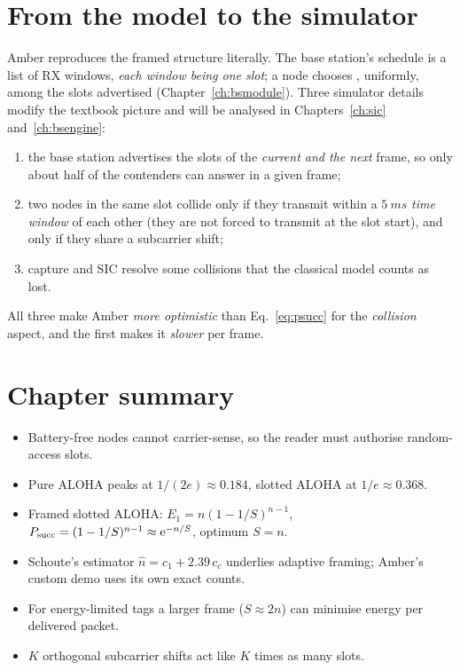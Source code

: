 \section{From the model to the simulator}

Amber reproduces the framed structure literally. The base station's schedule is a list of
RX windows, \emph{each window being one slot}; a node chooses , uniformly, among the slots advertised
(Chapter~\ref{ch:bsmodule}). Three simulator details modify the textbook picture and will be analysed in Chapters~\ref{ch:sic} and~\ref{ch:bsengine}:
\begin{enumerate}
 \item the base station advertises the slots of the \emph{current and the next} frame, so only about half of the contenders
   can answer in a given frame;
 \item two nodes in the same slot collide only if they transmit within a $\SI{5}{ms}$ \emph{time window} of each other
   (they are not forced to transmit at the slot start), and only if they share a subcarrier shift;
 \item capture and SIC resolve some collisions that the classical model counts as lost.
\end{enumerate}
All three make Amber \emph{more optimistic} than Eq.~\eqref{eq:psucc} for the \emph{collision} aspect, and the first makes it \emph{slower} per frame.

\section{Chapter summary}
\begin{itemize}
 \item Battery-free nodes cannot carrier-sense, so the reader must authorise random-access slots.
 \item Pure ALOHA peaks at $1/(2e)\approx0.184$, slotted ALOHA at $1/e\approx0.368$.
 \item Framed slotted ALOHA: $E_1=n(1-1/S)^{n-1}$, $P_{\mathrm{succ}}=(1-1/S)^{n-1}\approx\mathrm{e}^{-n/S}$, optimum $S=n$.
 \item Schoute's estimator $\hat n=c_1+2.39\,c_c$ underlies adaptive framing; Amber's custom demo uses its own exact counts.
 \item For energy-limited tags a larger frame ($S\approx2n$) can minimise energy per delivered packet.
 \item $K$ orthogonal subcarrier shifts act like $K$ times as many slots.
\end{itemize}

